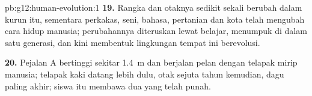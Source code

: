 \begin{solution}{pb:g12:human-evolution:1}
\textbf{19.} Rangka dan otaknya sedikit sekali berubah dalam kurun
itu, sementara perkakas, seni, bahasa, pertanian dan kota telah
mengubah cara hidup manusia; perubahannya diteruskan lewat belajar,
menumpuk di dalam satu generasi, dan kini membentuk lingkungan tempat
 ini berevolusi.

\textbf{20.} Pejalan A bertinggi sekitar \qty{1.4}{m} dan berjalan
pelan dengan telapak mirip manusia; telapak kaki datang lebih dulu,
otak sejuta tahun kemudian, dagu paling akhir; siswa itu membawa 
dua  yang telah punah.
\end{solution}
